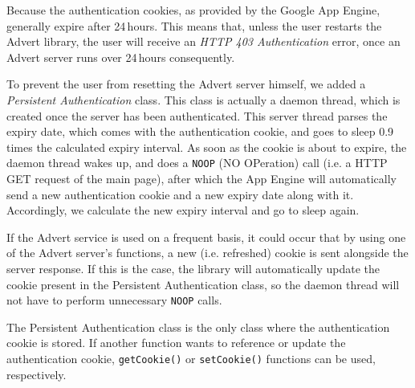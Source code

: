 Because the authentication cookies, as provided by the Google App Engine,
generally expire after 24\,hours. This means that, unless the user restarts the
Advert library, the user will receive an \emph{HTTP 403 Authentication} error,
once an Advert server runs over 24\,hours consequently. 

To prevent the user from resetting the Advert server himself, we added a
\emph{Persistent Authentication} class. This class is actually a daemon thread,
which is created once the server has been authenticated. This server thread
parses the expiry date, which comes with the authentication cookie, and goes to
sleep 0.9 times the calculated expiry interval. As soon as the cookie is about
to expire, the daemon thread wakes up, and does a \texttt{NOOP} (NO OPeration)
call (i.e. a HTTP GET request of the main page), after which the App Engine
will automatically send a new authentication cookie and a new expiry date along
with it. Accordingly, we calculate the new expiry interval and go to sleep
again.

If the Advert service is used on a frequent basis, it could occur that by using
one of the Advert server's functions, a new (i.e. refreshed) cookie is sent
alongside the server response. If this is the case, the library will
automatically update the cookie present in the Persistent Authentication class,
so the daemon thread will not have to perform unnecessary \texttt{NOOP} calls.

The Persistent Authentication class is the only class where the authentication
cookie is stored. If another function wants to reference or update the
authentication cookie, \texttt{getCookie()} or \texttt{setCookie()} functions
can be used, respectively.
